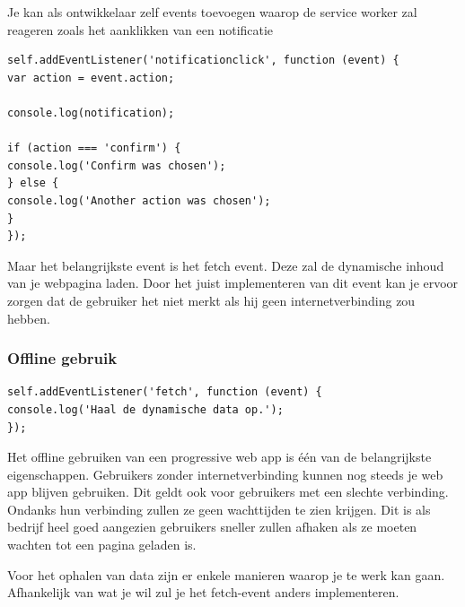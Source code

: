 Je kan als ontwikkelaar zelf events toevoegen waarop de service worker zal reageren zoals het aanklikken van een notificatie

\begin{lstlisting}
self.addEventListener('notificationclick', function (event) {
var action = event.action;

console.log(notification);

if (action === 'confirm') {
console.log('Confirm was chosen');
} else {
console.log('Another action was chosen');
}
});
\end{lstlisting}

Maar het belangrijkste event is het fetch event. Deze zal de dynamische inhoud van je webpagina laden. Door het juist implementeren van dit event kan je ervoor zorgen dat de gebruiker het niet merkt als hij geen internetverbinding zou hebben.


\clearpage
\subsubsection{Offline gebruik}
\begin{lstlisting}
self.addEventListener('fetch', function (event) {
console.log('Haal de dynamische data op.');
});
\end{lstlisting}

Het offline gebruiken van een progressive web app is één van de belangrijkste eigenschappen. Gebruikers zonder internetverbinding kunnen nog steeds je web app blijven gebruiken. Dit geldt ook voor gebruikers met een slechte verbinding. Ondanks hun verbinding zullen ze geen wachttijden te zien krijgen. Dit is als bedrijf heel goed aangezien gebruikers sneller zullen afhaken als ze moeten wachten tot een pagina geladen is.

Voor het ophalen van data zijn er enkele manieren waarop je te werk kan gaan. Afhankelijk van wat je wil zul je het fetch-event anders implementeren.
 
